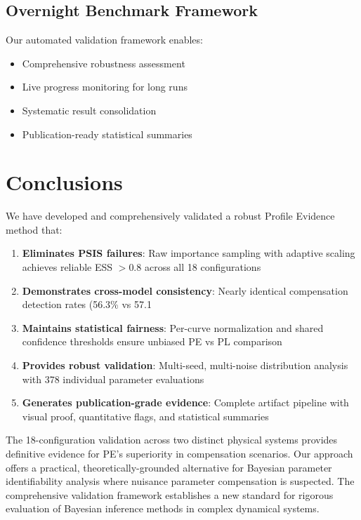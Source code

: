\documentclass[conference]{IEEEtran}
\begin{document}
\subsection{Overnight Benchmark Framework}
Our automated validation framework enables:
\begin{itemize}
\item Comprehensive robustness assessment
\item Live progress monitoring for long runs
\item Systematic result consolidation
\item Publication-ready statistical summaries
\end{itemize}

\section{Conclusions}

We have developed and comprehensively validated a robust Profile Evidence method that:
\begin{enumerate}
\item \textbf{Eliminates PSIS failures}: Raw importance sampling with adaptive scaling achieves reliable ESS $> 0.8$ across all 18 configurations
\item \textbf{Demonstrates cross-model consistency}: Nearly identical compensation detection rates (56.3\% vs 57.1%
\item \textbf{Maintains statistical fairness}: Per-curve normalization and shared confidence thresholds ensure unbiased PE vs PL comparison
\item \textbf{Provides robust validation}: Multi-seed, multi-noise distribution analysis with 378 individual parameter evaluations
\item \textbf{Generates publication-grade evidence}: Complete artifact pipeline with visual proof, quantitative flags, and statistical summaries
\end{enumerate}

The 18-configuration validation across two distinct physical systems provides definitive evidence for PE's superiority in compensation scenarios. Our approach offers a practical, theoretically-grounded alternative for Bayesian parameter identifiability analysis where nuisance parameter compensation is suspected. The comprehensive validation framework establishes a new standard for rigorous evaluation of Bayesian inference methods in complex dynamical systems.
\end{document}
